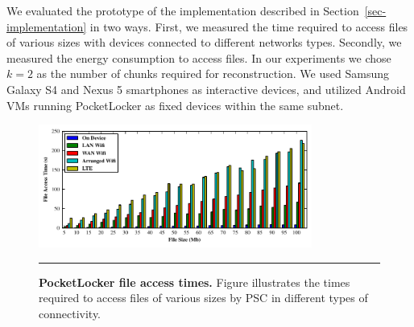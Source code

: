 We evaluated the prototype of the implementation described in
Section~\ref{sec-implementation} in two ways. First, we measured the time
required to access files of various sizes with devices connected to different
networks types. Secondly, we measured the energy consumption to access files.
In our experiments we chose $k=2$ as the number of chunks required for
reconstruction. We used Samsung Galaxy S4 and Nexus 5 smartphones as
interactive devices, and utilized Android VMs running PocketLocker as fixed
devices within the same subnet.

\begin{figure}[t]
  \centering
  \includegraphics[width=0.8\textwidth]{./figures/downloadtimes.pdf}
  
  \vspace*{-0.1in}

  \caption{\small \textbf{PocketLocker file access times.} Figure
    illustrates the
    times required to access files of various sizes by PSC in different
    types of
  connectivity.}

  \label{fig-evaluation-download}
  
  \vspace*{0.05in}

  \hrule

  \vspace*{-0.2in}

\end{figure}


